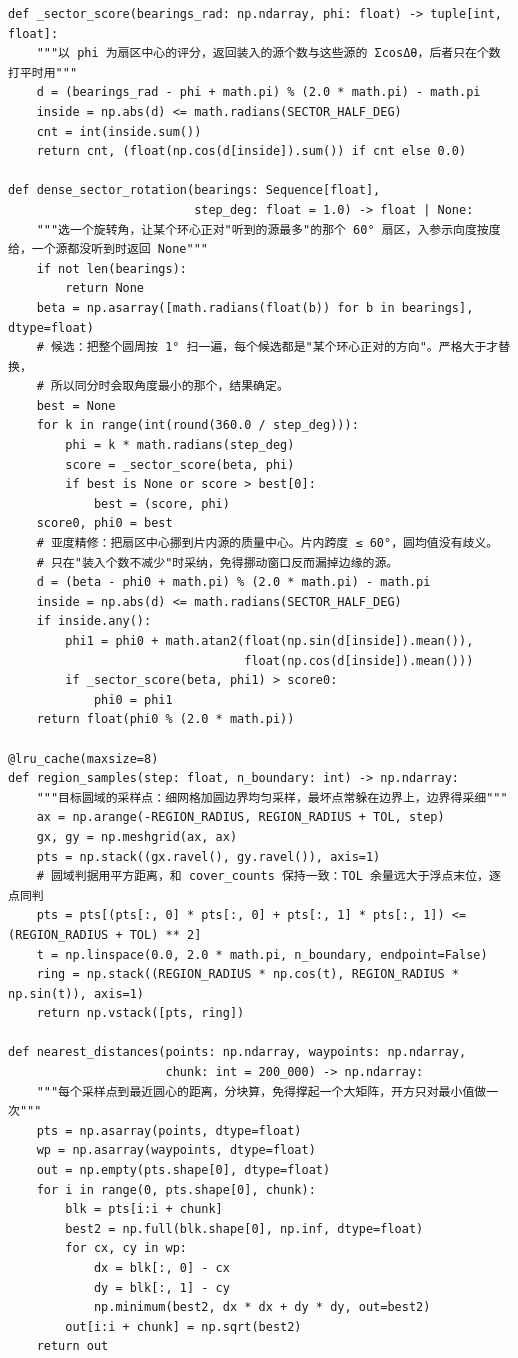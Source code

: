 \documentclass[UTF8, zihao=5,AutoFakeBold=2]{ctexart}
\begin{document}
\begin{lstlisting}
def _sector_score(bearings_rad: np.ndarray, phi: float) -> tuple[int, float]:
    """以 phi 为扇区中心的评分，返回装入的源个数与这些源的 ΣcosΔθ，后者只在个数打平时用"""
    d = (bearings_rad - phi + math.pi) % (2.0 * math.pi) - math.pi
    inside = np.abs(d) <= math.radians(SECTOR_HALF_DEG)
    cnt = int(inside.sum())
    return cnt, (float(np.cos(d[inside]).sum()) if cnt else 0.0)

def dense_sector_rotation(bearings: Sequence[float],
                          step_deg: float = 1.0) -> float | None:
    """选一个旋转角，让某个环心正对"听到的源最多"的那个 60° 扇区，入参示向度按度给，一个源都没听到时返回 None"""
    if not len(bearings):
        return None
    beta = np.asarray([math.radians(float(b)) for b in bearings], dtype=float)
    # 候选：把整个圆周按 1° 扫一遍，每个候选都是"某个环心正对的方向"。严格大于才替换，
    # 所以同分时会取角度最小的那个，结果确定。
    best = None
    for k in range(int(round(360.0 / step_deg))):
        phi = k * math.radians(step_deg)
        score = _sector_score(beta, phi)
        if best is None or score > best[0]:
            best = (score, phi)
    score0, phi0 = best
    # 亚度精修：把扇区中心挪到片内源的质量中心。片内跨度 ≤ 60°，圆均值没有歧义。
    # 只在"装入个数不减少"时采纳，免得挪动窗口反而漏掉边缘的源。
    d = (beta - phi0 + math.pi) % (2.0 * math.pi) - math.pi
    inside = np.abs(d) <= math.radians(SECTOR_HALF_DEG)
    if inside.any():
        phi1 = phi0 + math.atan2(float(np.sin(d[inside]).mean()),
                                 float(np.cos(d[inside]).mean()))
        if _sector_score(beta, phi1) > score0:
            phi0 = phi1
    return float(phi0 % (2.0 * math.pi))

@lru_cache(maxsize=8)
def region_samples(step: float, n_boundary: int) -> np.ndarray:
    """目标圆域的采样点：细网格加圆边界均匀采样，最坏点常躲在边界上，边界得采细"""
    ax = np.arange(-REGION_RADIUS, REGION_RADIUS + TOL, step)
    gx, gy = np.meshgrid(ax, ax)
    pts = np.stack((gx.ravel(), gy.ravel()), axis=1)
    # 圆域判据用平方距离，和 cover_counts 保持一致：TOL 余量远大于浮点末位，逐点同判
    pts = pts[(pts[:, 0] * pts[:, 0] + pts[:, 1] * pts[:, 1]) <= (REGION_RADIUS + TOL) ** 2]
    t = np.linspace(0.0, 2.0 * math.pi, n_boundary, endpoint=False)
    ring = np.stack((REGION_RADIUS * np.cos(t), REGION_RADIUS * np.sin(t)), axis=1)
    return np.vstack([pts, ring])

def nearest_distances(points: np.ndarray, waypoints: np.ndarray,
                      chunk: int = 200_000) -> np.ndarray:
    """每个采样点到最近圆心的距离，分块算，免得撑起一个大矩阵，开方只对最小值做一次"""
    pts = np.asarray(points, dtype=float)
    wp = np.asarray(waypoints, dtype=float)
    out = np.empty(pts.shape[0], dtype=float)
    for i in range(0, pts.shape[0], chunk):
        blk = pts[i:i + chunk]
        best2 = np.full(blk.shape[0], np.inf, dtype=float)
        for cx, cy in wp:
            dx = blk[:, 0] - cx
            dy = blk[:, 1] - cy
            np.minimum(best2, dx * dx + dy * dy, out=best2)
        out[i:i + chunk] = np.sqrt(best2)
    return out


\end{lstlisting}
\end{document}
